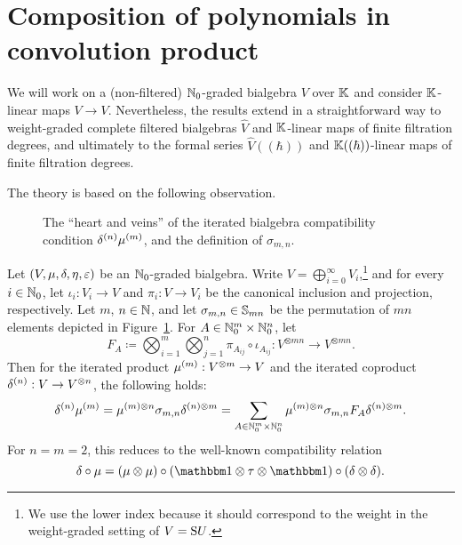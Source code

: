 \documentclass[\MainFolder/Text.tex]{subfiles}
\begin{document}
\section{Composition of polynomials in convolution product}\label{Sec:CompConvA}
\renewcommand{\Star}{*}
We will work on a (non-filtered) $\mathbb{N}_0$-graded bialgebra $V$ over $\mathbb{K}$ and consider $\mathbb{K}$-linear maps $V\rightarrow V$. Nevertheless, the results extend in a straightforward way to weight-graded complete filtered bialgebras $\hat{V}$ and $\mathbb{K}$-linear maps of finite filtration degrees, and ultimately to the formal series $\hat{V}((\hbar))$ and $\mathbb{K}((\hbar))$-linear maps of finite filtration degrees.

The theory is based on the following observation.
\begin{figure}[t]
\centering

\caption[The ``heart'' of the iterated bialgebra compatibility condition.]{The ``heart and veins'' of the iterated bialgebra compatibility condition $\delta^{(n)}\mu^{(m)}$, and the definition of $\sigma_{m,n}$.}
\label{Fig:Spider}
\end{figure}
\begin{Lemma}\label{Lem:ItCompCond}
Let $(V, \mu, \delta, \eta, \varepsilon)$ be an $\mathbb{N}_0$-graded bialgebra. Write $V = \bigoplus_{i=0}^\infty V_i$,\footnote{We use the lower index because it should correspond to the weight in the weight-graded setting of $V = \mathrm{S} U$.} and for every $i\in \mathbb{N}_0$, let $\iota_i : V_i \rightarrow V$ and $\pi_i: V \rightarrow V_i$ be the canonical inclusion and projection, respectively. Let $m$, $n\in \mathbb{N}$, and let $\sigma_{m,n}\in \mathbb{S}_{m n}$ be the permutation of $mn$ elements depicted in Figure~\ref{Fig:Spider}. For $A\in \mathbb{N}_0^{m} \times \mathbb{N}_{0}^n$, let
$$ F_{A}\coloneqq \bigotimes_{i=1}^m \bigotimes_{j=1}^n \pi_{A_{ij}}\circ \iota_{A_{ij}} : V^{\otimes m n } \longrightarrow V^{\otimes m n}. $$
Then for the iterated product $\mu^{(m)}: V^{\otimes m} \rightarrow V$ and the iterated coproduct $\delta^{(n)}: V\rightarrow V^{\otimes n}$, the following holds:
\begin{equation}\label{Eq:ItCompRel}
\delta^{(n)}\mu^{(m)} = \mu^{(m)\otimes n} \sigma_{m,n} \delta^{(n)\otimes m} =  \sum_{A\in \mathbb{N}_0^m \times \mathbb{N}_0^n} \mu^{(m)\otimes n} \sigma_{m,n}F_A \delta^{(n)\otimes m}.
\end{equation}
For $n=m=2$, this reduces to the well-known compatibility relation
\begin{equation}\label{Eq:BasicCompCond}
\MVCoProd\circ \MVProd = (\MVProd\otimes\MVProd)\circ (\Id\otimes\tau\otimes\Id)\circ(\MVCoProd\otimes\MVCoProd).
\end{equation}
\end{Lemma}
\end{document}
